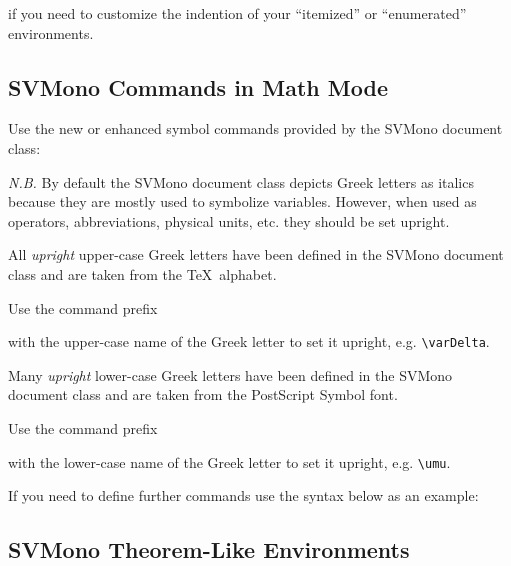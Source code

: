 \documentclass[graybox,square]{svmono}
\begin{document}
\begin{sloppy}
if you need to customize the indention of your ``itemized'' or ``enumerated'' environments.

\subsection{SVMono Commands in Math Mode}

Use the new or enhanced symbol commands provided by the {\sc SVMono} document class:

\cprotect{}

{\it N.B.} By default the SVMono document class depicts Greek letters as italics because they are mostly used to symbolize variables. However, when used as operators, abbreviations, physical units, etc. they should be set upright.

All {\it upright} upper-case Greek letters have been defined in the {\sc SVMono} document class and are taken from the \TeX\ alphabet.

Use the command prefix

\cprotect{}

with the upper-case name of the Greek letter to set it upright, e.g. \verb|\varDelta|.

Many {\it upright} lower-case Greek letters have been defined in the {\sc SVMono} document class and are taken from the PostScript Symbol font.

Use the command prefix

\cprotect{}

with the lower-case name of the Greek letter to set it upright, e.g. \verb|\umu|.

If you need to define further commands use the syntax below as an example:

\cprotect{}

\subsection{SVMono Theorem-Like Environments}


\end{sloppy}
\end{document}
